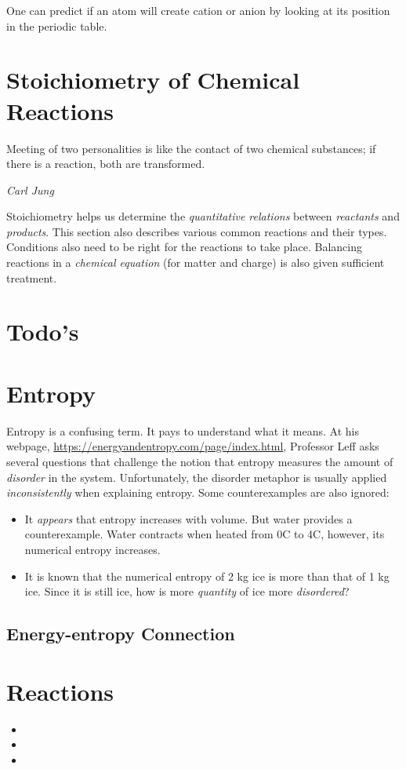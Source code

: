 \documentclass{article}
\begin{document}
One can predict if an atom will create cation or anion by looking at its position in the periodic table.

\section{Stoichiometry of Chemical Reactions}
\renewcommand{\epigraphsize}{\small}
\setlength{\epigraphwidth}{0.8\textwidth}
\epigraph
{
    Meeting of two personalities is like the contact of two chemical substances; if there is a reaction, both are transformed.
}
{
    \textit{Carl Jung}
}

\label{sec: stoichiometry}
Stoichiometry helps us determine the \textit{quantitative relations} between \textit{reactants} and \textit{products}. This section also describes various common reactions and their types. Conditions also need to be right for the reactions to take place. Balancing reactions in a \textit{chemical equation} (for matter and charge) is also given sufficient treatment.

\section{Todo's} 
\section{Entropy}
Entropy is a confusing term. It pays to understand what it means.
At his webpage, \url{https://energyandentropy.com/page/index.html}, Professor Leff asks several questions that challenge the notion that entropy measures the amount of \textit{disorder} in the system. Unfortunately, the disorder metaphor is usually applied \textit{inconsistently} when explaining entropy. Some counterexamples are also ignored:
\begin{itemize}
    \item It \textit{appears} that entropy increases with volume. But water provides a counterexample. Water contracts when heated from 0\degree C to 4\degree C, however, its numerical entropy increases.
    \item It is known that the numerical entropy of 2 kg ice is more than that of 1 kg ice. Since it is still ice, how is more \textit{quantity} of ice more \textit{disordered}?
\end{itemize}

\subsection{Energy-entropy Connection}

\section{Reactions}
\begin{itemize}
    \item {}
    \item {}
    \item {}
\end{itemize}
\end{document}
